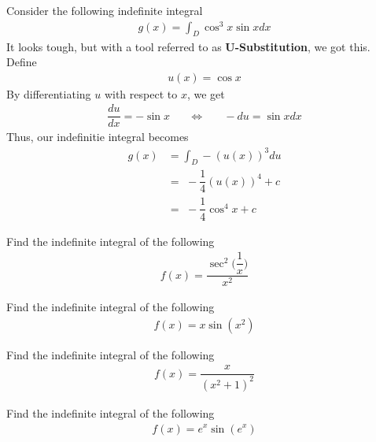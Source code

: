 \begin{example}
Consider the following indefinite integral
\begin{align*}
    g(x) = \int_{D} \cos^{3} x \sin x dx
\end{align*}
It looks tough, but with a tool referred to as \textbf{U-Substitution}, we got this. Define
\begin{align*}
    u(x) = \cos x
\end{align*}
By differentiating $u$ with respect to $x$, we get
\begin{align*}
    \dfrac{du}{dx} = -\sin x \hspace{20pt} \Longleftrightarrow \hspace{20pt} -du = \sin x dx
\end{align*}
Thus, our indefinitie integral becomes
\begin{align*}
    g(x) &= \int_{D} -(u(x))^{3} du\\[2ex]
    &= \hspace{4pt} -\dfrac{1}{4} (u(x))^{4} + c\\[2ex]
    &= \hspace{4pt} -\dfrac{1}{4} \cos^{4} x + c
\end{align*}
\end{example}

\begin{exercise}
Find the indefinite integral of the following 
\begin{align*}
    f(x) = \dfrac{\sec^{2} \Big(\dfrac{1}{x}\Big)}{x^{2}}
\end{align*}
\end{exercise}

\begin{exercise}
Find the indefinite integral of the following 
\begin{align*}
    f(x) = x \sin(x^{2})
\end{align*}
\end{exercise}

\begin{exercise}
Find the indefinite integral of the following 
\begin{align*}
    f(x) = \dfrac{x}{(x^{2} + 1)^{2}}
\end{align*}
\end{exercise}

\begin{exercise}
Find the indefinite integral of the following 
\begin{align*}
    f(x) = e^{x} \sin (e^{x})
\end{align*}
\end{exercise}

